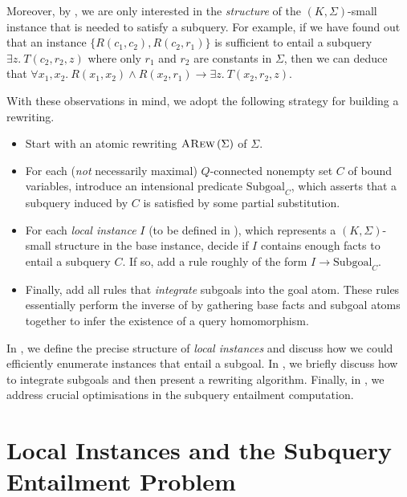 \documentclass[12pt]{report}
\theoremstyle{plain}
\theoremstyle{definition}
\newcommand{\ARew}[1]{\ensuremath{\normalfont{\textsc{ARew}} \left( #1 \right)}}
\begin{document}

Moreover, by , we are only interested in the \emph{structure} of the $(K, \Sigma)$-small instance that is needed to satisfy a subquery. For example, if we have found out that an instance $\{R(c_1, c_2), R(c_2, r_1)\}$ is sufficient to entail a subquery $\exists z.\ T(c_2, r_2, z)$ where only $r_1$ and $r_2$ are constants in $\Sigma$, then we can deduce that $\forall x_1, x_2.\ R(x_1, x_2) \wedge R(x_2, r_1) \rightarrow \exists z.\ T(x_2, r_2, z)$.

With these observations in mind, we adopt the following strategy for building a rewriting.

\begin{itemize}
  \item Start with an atomic rewriting $\ARew{\Sigma}$ of $\Sigma$.
  \item For each (\emph{not} necessarily maximal) $Q$-connected nonempty set $C$ of bound variables, introduce an intensional predicate $\mathrm{Subgoal}_C$, which asserts that a subquery induced by $C$ is satisfied by some partial substitution.
  \item For each \emph{local instance} $I$ (to be defined in ), which represents a $(K, \Sigma)$-small structure in the base instance, decide if $I$ contains enough facts to entail a subquery $C$. If so, add a rule roughly of the form $I \rightarrow \mathrm{Subgoal}_C$.
  \item Finally, add all rules that \emph{integrate} subgoals into the goal atom. These rules essentially perform the inverse of  by gathering base facts and subgoal atoms together to infer the existence of a query homomorphism.
\end{itemize}

In , we define the precise structure of \emph{local instances} and discuss how we could efficiently enumerate instances that entail a subgoal. In , we briefly discuss how to integrate subgoals and then present a rewriting algorithm. Finally, in , we address crucial optimisations in the subquery entailment computation.

\section{Local Instances and the Subquery Entailment Problem}
\label{local-instances-and-the-subquery-entailment-problem}
\end{document}

